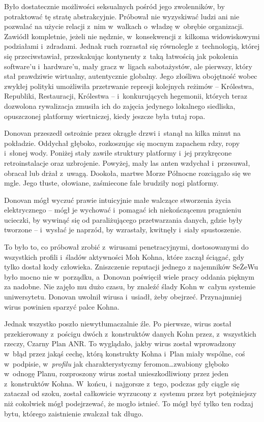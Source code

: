 \documentclass[oneside,polish,11pt,sfheadings]{mwbk}
\begin{document}
Było dostatecznie możliwości seksualnych pośród jego zwolenników, by
potraktować tę stratę abstrakcyjnie. Próbował nie wyzyskiwać ludzi ani
nie pozwalać na użycie relacji z~nim w~walkach o~władzę w~obrębie
organizacji. Zawiódł kompletnie, jeżeli nie nędznie, w~konsekwencji z~kilkoma widowiskowymi podziałami i~zdradami. Jednak ruch rozrastał się
równolegle z~technologią, której się przeciwstawiał, przeskakując
kontynenty z~taką łatwością jak pokolenia software'u i~hardware'u, mały
gracz w~ligach sabotażystów, ale pierwszy, który stał prawdziwie
wirtualny, autentycznie globalny. Jego złośliwa obojętność wobec zwykłej
polityki umożliwiła przetrwanie represji kolejnych reżimów -- Królestwa,
Republiki, Restauracji, Królestwa -- i~konkurujących hegemonii, których
teraz dozwolona rywalizacja zmusiła ich do zajęcia jedynego lokalnego
siedliska, opuszczonej platformy wiertniczej, kiedy jeszcze była tutaj
ropa.

Donovan przeszedł ostrożnie przez okrągłe drzwi i~stanął na kilka minut
na pokładzie. Oddychał głęboko, rozkoszując się mocnym zapachem rdzy,
ropy i~słonej wody. Poniżej stały zawiłe struktury platformy i~jej
przykręcone retroinstalacje oraz uzbrojenie. Powyżej, mały las anten
wzdychał i~przesuwał, obracał lub drżał z~uwagą. Dookoła, martwe Morze
Północne rozciągało się we mgle. Jego tłuste, ołowiane, zaśmiecone fale
brudziły nogi platformy.

Donovan mógł wyczuć prawie intuicyjnie małe walczące stworzenia życia
elektrycznego -- mógł je wychować i~pomagać ich niekończącemu pragnieniu
ucieczki, by wywinąć się od paraliżującego przetwarzania danych, gdzie
były tworzone -- i~wysłać je naprzód, by wzrastały, kwitnęły i~siały
spustoszenie.

To było to, co próbował zrobić z~wirusami penetracyjnymi, dostosowanymi
do wszystkich profili i~śladów aktywności Moh Kohna, które zaczął
ściągać, gdy tylko dostał kody człowieka. Zniszczenie reputacji jednego
z najemników SeŻeWu było mocno nie w~porządku, a~Donovan poświęcił wiele
pracy oddania pięknym za nadobne. Nie zajęło mu dużo czasu, by znaleźć
ślady Kohn w~całym systemie uniwersytetu. Donovan uwolnił wirusa i~usiadł, żeby obejrzeć. Przynajmniej wirus powinien sparzyć palce Kohna.

Jednak wszystko poszło niewytłumaczalnie źle. Po pierwsze, wirus został
przekierowany z~pościgu dwóch z~konstruktów danych Kohn przez, z~wszystkich rzeczy, Czarny Plan ANR. To wyglądało, jakby wirus został
wprowadzony w~błąd przez jakąś cechę, którą konstrukty Kohna i~Plan
miały wspólne, coś w~podpisie, w~\emph{profilu }jak charakterystyczny
feromon\ldots zwabiony głęboko w~odnogę Planu, rozproszony wirus został
unieszkodliwiony przez jeden z~konstruktów Kohna. W~końcu, i~najgorsze z~tego, podczas gdy ciągle się zataczał od szoku, został całkowicie
wyrzucony z~systemu przez byt potężniejszy niż cokolwiek mógł
podejrzewać, że mogło istnieć. To mógł być tylko ten rodzaj bytu,
którego zaistnienie zwalczał tak długo.
\end{document}
